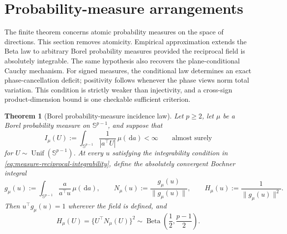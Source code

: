 \documentclass[11pt]{article}
\numberwithin{equation}{section}
\theoremstyle{thmstyleone}%
\newtheorem{theorem}{Theorem}[section]
\theoremstyle{thmstyletwo}%
\let\cref\autoref
\newcommand{\sphere}{\mathbb S}
\newcommand{\dd}{\,\mathrm d}
\newcommand{\Beta}{\operatorname{Beta}}
\newcommand{\Unif}{\operatorname{Unif}}
\begin{document}
\section{Probability-measure arrangements}
\label{sec:measure-arrangements}

The finite theorem concerns atomic probability measures on the space of
directions.  This section removes atomicity.  Empirical approximation extends
the Beta law to arbitrary Borel probability measures provided the reciprocal
field is absolutely integrable.  The same hypothesis also recovers the
plane-conditional Cauchy mechanism.  For signed measures, the conditional law
determines an exact phase-cancellation deficit; positivity follows whenever
the phase views norm total variation.  This condition is strictly weaker than
injectivity, and a cross-sign product-dimension bound is one checkable
sufficient criterion.

\begin{theorem}[Borel probability-measure incidence law]
\label{thm:measure-beta}
Let \(p\geq2\), let \(\mu\) be a Borel probability measure on
\(\sphere^{p-1}\), and suppose that
\begin{equation}
  I_\mu(U)
  :=
  \int_{\sphere^{p-1}}
  \frac{1}{|a^\top U|}
  \,\mu(\dd a)
  <\infty
  \qquad\text{almost surely}
  \label{eq:measure-reciprocal-integrability}
\end{equation}
for \(U\sim\Unif(\sphere^{p-1})\).  At every \(u\) satisfying the
integrability condition in \cref{eq:measure-reciprocal-integrability}, define
the absolutely convergent Bochner integral
\begin{equation}
  g_\mu(u)
  :=
  \int_{\sphere^{p-1}}
  \frac{a}{a^\top u}
  \,\mu(\dd a),
  \qquad
  N_\mu(u):=\frac{g_\mu(u)}{\|g_\mu(u)\|},
  \qquad
  H_\mu(u):=\frac{1}{\|g_\mu(u)\|^2}.
  \label{eq:measure-reciprocal-field}
\end{equation}
Then \(u^\top g_\mu(u)=1\) wherever the field is defined, and
\begin{equation}
  H_\mu(U)
  =
  \{U^\top N_\mu(U)\}^2
  \sim
  \Beta\!\left(\frac12,\frac{p-1}{2}\right).
  \label{eq:measure-beta}
\end{equation}
\end{theorem}
\end{document}
